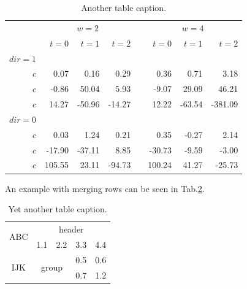 \begin{table}[!htb]
  \centering
  \renewcommand{\arraystretch}{1.2} %
  \begin{tabular}{@{}rrrrcrrr@{}} %
    \toprule
      & \multicolumn{3}{c}{$w = 2$} & \phantom{abc} & \multicolumn{3}{c}{$w = 4$} \\
    \cmidrule{2-4}
    \cmidrule{6-8}
      & $t=0$ & $t=1$ & $t=2$ && $t=0$ & $t=1$ & $t=2$ \\
    \midrule
      $dir=1$
      \\
      $c$ &  0.07 &  0.16 &  0.29 &&  0.36 &  0.71 &   3.18 \\
      $c$ & -0.86 & 50.04 &  5.93 && -9.07 & 29.09 &  46.21 \\
      $c$ & 14.27 &-50.96 &-14.27 && 12.22 &-63.54 &-381.09 \\
      $dir=0$
      \\
      $c$ &  0.03 &  1.24 &  0.21 &&  0.35 & -0.27 &  2.14 \\
      $c$ &-17.90 &-37.11 &  8.85 &&-30.73 & -9.59 & -3.00 \\
      $c$ &105.55 & 23.11 &-94.73 &&100.24 & 41.27 &-25.73 \\
    \bottomrule
  \end{tabular}
  \caption{Another table caption.}
  \label{tab:multipleColumns}
\end{table}

An example with merging rows can be seen in Tab.\ref{tab:multipleRows}.

\begin{table}[!htb]
  \renewcommand{\arraystretch}{1.2} %
  \centering
  \begin{tabular}{ccccc}
    \toprule
      \multirow{2}{*}{ABC} & \multicolumn{4}{c}{header} \\
      \cmidrule{2-5} & 1.1 & 2.2 & 3.3 & 4.4 \\
    \midrule
      \multirow{2}{*}{IJK} & \multicolumn{2}{c}{\multirow{2}{*}{group}} & 0.5 & 0.6 \\
      \cmidrule{4-5}       & \multicolumn{2}{c}{}                       & 0.7 & 1.2 \\
    \bottomrule
  \end{tabular}
  \caption{Yet another table caption.}
  \label{tab:multipleRows}
\end{table}

